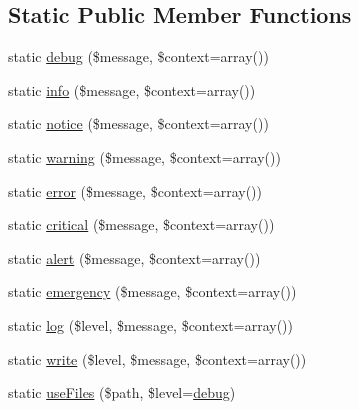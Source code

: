 \subsection*{Static Public Member Functions}
\begin{DoxyCompactItemize}
\item 
static \mbox{\hyperlink{class_illuminate_1_1_support_1_1_facades_1_1_log_a4a6186c4b8318f3096e043e59a2683f8}{debug}} (\$message, \$context=array())
\item 
static \mbox{\hyperlink{class_illuminate_1_1_support_1_1_facades_1_1_log_acbbeebd340cccb5b259b123086d962d3}{info}} (\$message, \$context=array())
\item 
static \mbox{\hyperlink{class_illuminate_1_1_support_1_1_facades_1_1_log_a763d78ea6e79ac04371d3c2e59470b9b}{notice}} (\$message, \$context=array())
\item 
static \mbox{\hyperlink{class_illuminate_1_1_support_1_1_facades_1_1_log_a48aba756d59b9b8ad7be5d67e5ea0860}{warning}} (\$message, \$context=array())
\item 
static \mbox{\hyperlink{class_illuminate_1_1_support_1_1_facades_1_1_log_aef174a11b64b8e9c5ed1ba6cc8e5bb4a}{error}} (\$message, \$context=array())
\item 
static \mbox{\hyperlink{class_illuminate_1_1_support_1_1_facades_1_1_log_a2f93306eee277c10de13357087185b17}{critical}} (\$message, \$context=array())
\item 
static \mbox{\hyperlink{class_illuminate_1_1_support_1_1_facades_1_1_log_a65867128ee36796382e33c5546f18aae}{alert}} (\$message, \$context=array())
\item 
static \mbox{\hyperlink{class_illuminate_1_1_support_1_1_facades_1_1_log_a5da3678ba016f92e8c882a7adf1ca9e4}{emergency}} (\$message, \$context=array())
\item 
static \mbox{\hyperlink{class_illuminate_1_1_support_1_1_facades_1_1_log_a3b7d90ecb5892e00e9f4fed096cef427}{log}} (\$level, \$message, \$context=array())
\item 
static \mbox{\hyperlink{class_illuminate_1_1_support_1_1_facades_1_1_log_ac215cf462c16fdc847eea15bd760690e}{write}} (\$level, \$message, \$context=array())
\item 
static \mbox{\hyperlink{class_illuminate_1_1_support_1_1_facades_1_1_log_a498cc17d8075089609bf0875887d5a50}{use\+Files}} (\$path, \$level=\textquotesingle{}\mbox{\hyperlink{class_illuminate_1_1_support_1_1_facades_1_1_log_a4a6186c4b8318f3096e043e59a2683f8}{debug}}\textquotesingle{})
\item 

\end{DoxyCompactItemize}

